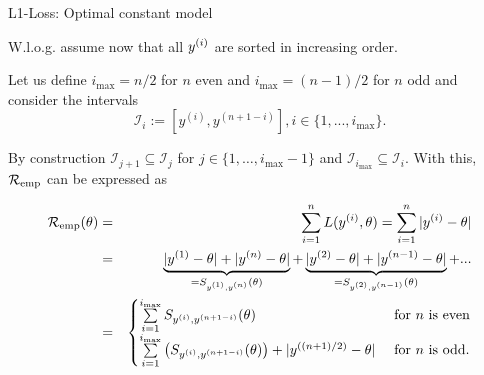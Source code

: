 \documentclass[11pt,compress,t,notes=noshow, xcolor=table]{beamer}
\begin{document}
\begin{vbframe}{L1-Loss: Optimal constant model}
\begin{itemize}
  \framebreak

  W.l.o.g. assume now that all $\yi$ are sorted in increasing order.

  Let us define $i_{\max} = n / 2$ for $n$ even and $i_{\max} = (n - 1) / 2$ for $n$ odd and consider the intervals 
  $$
    \mathcal{I}_i := [y^{(i)},y^{(n+1-i)}], i \in \{1, ..., i_{\max}\}. 
  $$

  By construction $\mathcal{I}_{j+1} \subseteq \mathcal{I}_j$ for $j \in \{1,\dots,i_{\max}-1\}$ and $\mathcal{I}_{i_{\max}} \subseteq \mathcal{I}_i$. With this, $\riske$ can be expressed as
  \begin{footnotesize}
  \begin{eqnarray*}
  \riske(\theta) &=& \sumin L(\yi,\theta) = \sumin|\yi - \theta| \\ 
  &=& \underbrace{|\yi[1] - \theta| + |\yi[n] - \theta|}_{= S_{\yi[1], \yi[n]}(\theta)} + \underbrace{|\yi[2] - \theta| + |\yi[n - 1] - \theta|}_{= S_{\yi[2], \yi[n - 1]}(\theta)} + ...  \\
  &=& \begin{cases} \sum\limits_{i = 1}^{i_{\max}} S_{\yi, \yi[n + 1 - i]}(\theta) & \text{ for } n \text{ is even} \\
  \sum\limits_{i = 1}^{i_{\max}} \left(S_{\yi, \yi[n + 1 - i]}(\theta)\right) + |\yi[(n + 1)/2] - \theta| & \text{ for } n \text{ is odd}. \end{cases}
  \end{eqnarray*}
  \end{footnotesize}

  \framebreak 



\end{itemize}
\end{vbframe}
\end{document}
